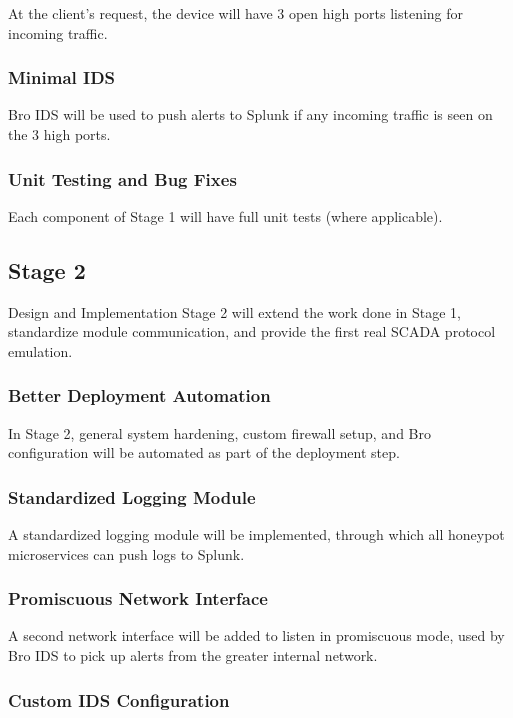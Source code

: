 At the client's request, the device will have 3 open high ports listening
for incoming traffic.

\subsubsection{Minimal IDS}

Bro IDS will be used to push alerts to Splunk if any incoming traffic is seen
on the 3 high ports.

\subsubsection{Unit Testing and Bug Fixes}

Each component of Stage 1 will have full unit tests (where applicable).


\subsection{Stage 2}

Design and Implementation Stage 2 will extend the work done in Stage 1,
standardize module communication, and provide the first real SCADA protocol
emulation.

\subsubsection{Better Deployment Automation}

In Stage 2, general system hardening, custom firewall setup, and Bro
configuration will be automated as part of the deployment step.

\subsubsection{Standardized Logging Module}

A standardized logging module will be implemented, through which all honeypot
microservices can push logs to Splunk.

\subsubsection{Promiscuous Network Interface}

A second network interface will be added to listen in promiscuous mode, used
by Bro IDS to pick up alerts from the greater internal network.

\subsubsection{Custom IDS Configuration}


